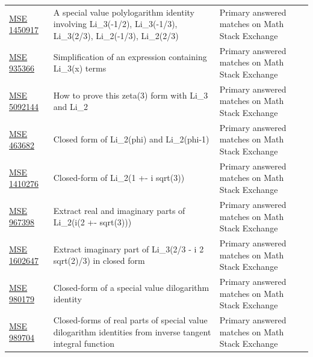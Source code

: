 \begin{longtable}{@{}p{}p{}p{}@{}}
\href{https://math.stackexchange.com/questions/1450917/a-special-value-polylogarithm-identity-involving-textli-3-1-2-textli}{MSE 1450917} & A special value polylogarithm identity involving Li\_3(-1/2), Li\_3(-1/3), Li\_3(2/3), Li\_2(-1/3), Li\_2(2/3) & Primary answered matches on Math Stack Exchange\\
\href{https://math.stackexchange.com/questions/935366/simplification-of-an-expression-containing-operatornameli-3x-terms}{MSE 935366} & Simplification of an expression containing Li\_3(x) terms & Primary answered matches on Math Stack Exchange\\
\href{https://math.stackexchange.com/questions/5092144/how-to-prove-this-zeta3-form-with-operatornameli-3-and-operatorname}{MSE 5092144} & How to prove this zeta(3) form with Li\_3 and Li\_2 & Primary answered matches on Math Stack Exchange\\
\href{https://math.stackexchange.com/questions/463682/closed-form-of-operatornameli-2-varphi-and-operatornameli-2-varphi-1}{MSE 463682} & Closed form of Li\_2(phi) and Li\_2(phi-1) & Primary answered matches on Math Stack Exchange\\
\href{https://math.stackexchange.com/questions/1410276/closed-form-of-operatornameli-2-left1-pm-i-sqrt3-right}{MSE 1410276} & Closed-form of Li\_2(1 +- i sqrt(3)) & Primary answered matches on Math Stack Exchange\\
\href{https://math.stackexchange.com/questions/967398/extract-real-and-imaginary-parts-of-operatornameli-2-lefti-left2-pm-sqrt3}{MSE 967398} & Extract real and imaginary parts of Li\_2(i(2 +- sqrt(3))) & Primary answered matches on Math Stack Exchange\\
\href{https://math.stackexchange.com/questions/1602647/extract-imaginary-part-of-textli-3-left-frac23-i-frac2-sqrt23-ri}{MSE 1602647} & Extract imaginary part of Li\_3(2/3 - i 2 sqrt(2)/3) in closed form & Primary answered matches on Math Stack Exchange\\
\href{https://math.stackexchange.com/questions/980179/closed-form-of-a-special-value-dilogarithm-identity}{MSE 980179} & Closed-form of a special value dilogarithm identity & Primary answered matches on Math Stack Exchange\\
\href{https://math.stackexchange.com/questions/989704/closed-forms-of-real-parts-of-special-value-dilogarithm-identities-from-inverse}{MSE 989704} & Closed-forms of real parts of special value dilogarithm identities from inverse tangent integral function & Primary answered matches on Math Stack Exchange\\

\end{longtable}
